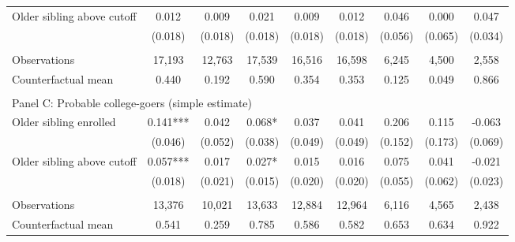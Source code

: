 {{\begin{tabular}{lcccccccc}
Older sibling above cutoff&       0.012   &       0.009   &       0.021   &       0.009   &       0.012   &       0.046   &       0.000   &       0.047   \\
                    &     (0.018)   &     (0.018)   &     (0.018)   &     (0.018)   &     (0.018)   &     (0.056)   &     (0.065)   &     (0.034)   \\
                    &               &               &               &               &               &               &               &               \\
Observations        &      17,193   &      12,763   &      17,539   &      16,516   &      16,598   &       6,245   &       4,500   &       2,558   \\
Counterfactual mean &       0.440   &       0.192   &       0.590   &       0.354   &       0.353   &       0.125   &       0.049   &       0.866   \\
 
&  &  &  & & & & & & \\
\multicolumn{9}{l}{Panel C: Probable college-goers (simple estimate)} \\
Older sibling enrolled&       0.141***&       0.042   &       0.068*  &       0.037   &       0.041   &       0.206   &       0.115   &      -0.063   \\
                    &     (0.046)   &     (0.052)   &     (0.038)   &     (0.049)   &     (0.049)   &     (0.152)   &     (0.173)   &     (0.069)   \\
 
Older sibling above cutoff&       0.057***&       0.017   &       0.027*  &       0.015   &       0.016   &       0.075   &       0.041   &      -0.021   \\
                    &     (0.018)   &     (0.021)   &     (0.015)   &     (0.020)   &     (0.020)   &     (0.055)   &     (0.062)   &     (0.023)   \\
                    &               &               &               &               &               &               &               &               \\
Observations        &      13,376   &      10,021   &      13,633   &      12,884   &      12,964   &       6,116   &       4,565   &       2,438   \\
Counterfactual mean &       0.541   &       0.259   &       0.785   &       0.586   &       0.582   &       0.653   &       0.634   &       0.922   \\
 

    \bottomrule 
    \end{tabular}
    }
}